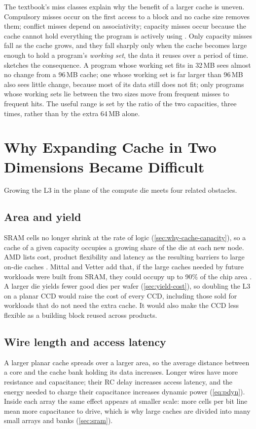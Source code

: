 The textbook's miss classes explain why the benefit of a larger cache is uneven. Compulsory misses occur on the first access to a block and no cache size removes them; conflict misses depend on associativity; capacity misses occur because the cache cannot hold everything the program is actively using \cite[sec.~11.3.2]{sarangi2025basic}. Only capacity misses fall as the cache grows, and they fall sharply only when the cache becomes large enough to hold a program's \emph{working set}, the data it reuses over a period of time.  sketches the consequence. A program whose working set fits in 32\,MB sees almost no change from a 96\,MB cache; one whose working set is far larger than 96\,MB also sees little change, because most of its data still does not fit; only programs whose working sets lie between the two sizes move from frequent misses to frequent hits. The useful range is set by the ratio of the two capacities, three times, rather than by the extra 64\,MB alone.



\section{Why Expanding Cache in Two Dimensions Became Difficult}
\label{sec:planar-limits}

Growing the L3 in the plane of the compute die meets four related obstacles.

\subsection{Area and yield}
SRAM cells no longer shrink at the rate of logic (\cref{sec:why-cache-capacity}), so a cache of a given capacity occupies a growing share of the die at each new node. AMD lists cost, product flexibility and latency as the resulting barriers to large on-die caches \cite[slide~6]{wuu2022vcache}. Mittal and Vetter add that, if the large caches needed by future workloads were built from SRAM, they could occupy up to 90\% of the chip area \cite[sec.~1]{mittalSurveyTechniquesArchitecting2016}. A larger die yields fewer good dies per wafer (\cref{sec:yield-cost}), so doubling the L3 on a planar CCD would raise the cost of every CCD, including those sold for workloads that do not need the extra cache. It would also make the CCD less flexible as a building block reused across products.

\subsection{Wire length and access latency}
A larger planar cache spreads over a larger area, so the average distance between a core and the cache bank holding its data increases. Longer wires have more resistance and capacitance; their RC delay increases access latency, and the energy needed to charge their capacitance increases dynamic power (\cref{eq:pdyn}). Inside each array the same effect appears at smaller scale: more cells per bit line mean more capacitance to drive, which is why large caches are divided into many small arrays and banks (\cref{sec:sram}).

